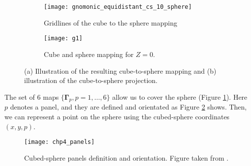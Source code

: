 \begin{figure}[!htb]
	\centering
	\begin{subfigure}{0.42\textwidth}
		\texttt{[image: gnomonic\_equidistant\_cs\_10\_sphere]}
		\caption{Gridlines of the cube to the sphere mapping}
	\end{subfigure}
	\begin{subfigure}{0.42\textwidth}
		\centering
		\texttt{[image: g1]}
		\caption{Cube and sphere mapping for $Z=0$.}
	\end{subfigure}
	\caption{(a) Illustration of the resulting cube-to-sphere mapping and (b) illustration of the cube-to-sphere projection.\label{chp-cs-equidistant}}
\end{figure}
The set of 6 maps $\{\boldsymbol{\Gamma}_{p}, p = 1, \ldots, 6\}$ allow us to cover the sphere (Figure \ref{chp-cs-equidistant}).
Here $p$ denotes a panel, and they are defined and orientated as Figure \ref{chp-cs-panels}
shows. Then, we can represent a point on the sphere using the cubed-sphere coordinates
$(x,y,p)$.

\begin{figure}[!htb]
	\centering
	\texttt{[image: chp4\_panels]}
	\caption{Cubed-sphere panels definition and orientation.
    Figure taken from \citet{jung:2019}.\label{chp-cs-panels}}
\end{figure}

